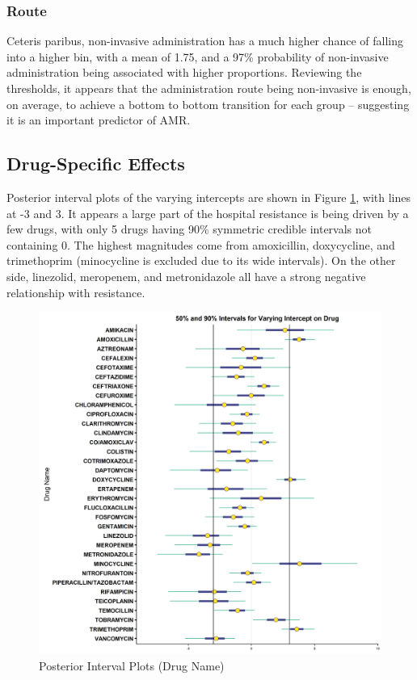 \documentclass[11pt,twoside]{article}
\numberwithin{Theorem}{section}
\numberwithin{Definition}{section}
\numberwithin{Lemma}{section}
\numberwithin{Algorithm}{section}
\numberwithin{equation}{section}
\begin{document}
\subsubsection{Route}

Ceteris paribus, non-invasive administration has a much higher chance of falling into a higher bin, with a mean of 1.75, and a 97\% probability of non-invasive administration being associated with higher proportions. Reviewing the thresholds, it appears that the administration route being non-invasive is enough, on average, to achieve a bottom to bottom transition for each group -- suggesting it is an important predictor of AMR. 


\newpage

\subsection{Drug-Specific Effects}

Posterior interval plots of the varying intercepts are shown in Figure \ref{fig::5_Intervals_Name}, with lines at -3 and 3. It appears a large part of the hospital resistance is being driven by a few drugs, with only 5 drugs having 90\% symmetric credible intervals not containing 0. The highest magnitudes come from amoxicillin, doxycycline, and trimethoprim (minocycline is excluded due to its wide intervals). On the other side, linezolid, meropenem, and metronidazole all have a strong negative relationship with resistance.  

\begin{figure}[h!]
	\centering
	\includegraphics[width = 1\textwidth]{Figures/5_1_Intervals_Name.png}
	\caption{Posterior Interval Plots (Drug Name)} \label{fig::5_Intervals_Name}	
\end{figure}
\end{document}
